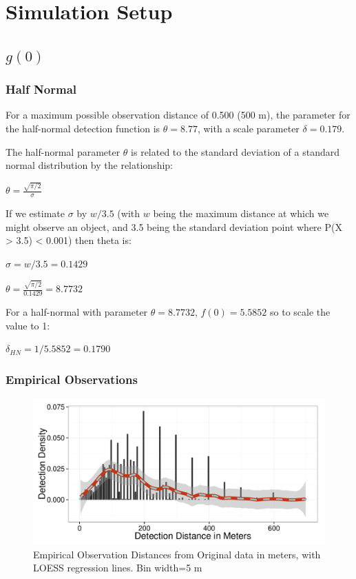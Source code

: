 \documentclass[12pt]{article}
\begin{document}
\section{Simulation Setup}
\subsection{$g(0)$}
\subsubsection{Half Normal}
For a maximum possible observation distance of 0.500 (500 m), the parameter for the half-normal detection function is $\theta = 8.77$, with a scale parameter $\delta = 0.179$.

The half-normal parameter $\theta$ is related to the standard deviation of a standard normal distribution by the relationship:

$\theta = \frac{\sqrt{\pi /2}}{\sigma}$

If we estimate $\sigma$ by $w/3.5$ (with $w$ being the maximum distance at which we might observe an object, and 3.5 being the standard deviation point where P(X > 3.5) < 0.001) then theta is:

$\sigma = w/3.5 = 0.1429$

$\theta = \frac{\sqrt{\pi /2}}{0.1429}=8.7732$

For a half-normal with parameter $\theta=8.7732$, $f(0)=5.5852$ so to scale the value to 1:

$\delta_{HN} = 1/5.5852 = 0.1790$

\subsubsection{Empirical Observations}
\begin{figure}

	\includegraphics[width=\textwidth]{../images/loess.pdf}
	\caption{Empirical Observation Distances from Original data in meters, with LOESS regression lines. Bin width=5 m\label{fig:by5}}
		
\end{figure}
\end{document}
